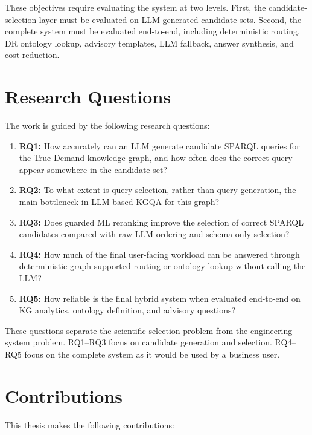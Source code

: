 \documentclass[
  12pt,
  english,
  oneside]{report}
\begin{document}
These objectives require evaluating the system at two levels. First, the candidate-selection layer must be evaluated on LLM-generated candidate sets. Second, the complete system must be evaluated end-to-end, including deterministic routing, DR ontology lookup, advisory templates, LLM fallback, answer synthesis, and cost reduction.

\section{Research Questions}

The work is guided by the following research questions:

\begin{enumerate}
    \item \textbf{RQ1:} How accurately can an LLM generate candidate SPARQL queries for the True Demand knowledge graph, and how often does the correct query appear somewhere in the candidate set?
    \item \textbf{RQ2:} To what extent is query selection, rather than query generation, the main bottleneck in LLM-based KGQA for this graph?
    \item \textbf{RQ3:} Does guarded ML reranking improve the selection of correct SPARQL candidates compared with raw LLM ordering and schema-only selection?
    \item \textbf{RQ4:} How much of the final user-facing workload can be answered through deterministic graph-supported routing or ontology lookup without calling the LLM?
    \item \textbf{RQ5:} How reliable is the final hybrid system when evaluated end-to-end on KG analytics, ontology definition, and advisory questions?
\end{enumerate}

These questions separate the scientific selection problem from the engineering system problem. RQ1--RQ3 focus on candidate generation and selection. RQ4--RQ5 focus on the complete system as it would be used by a business user.

\section{Contributions}

This thesis makes the following contributions:
\end{document}
